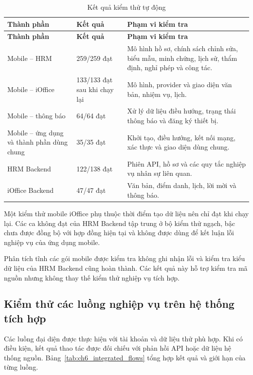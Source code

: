 \begin{xltabular}{\textwidth}{|L{2.8cm}|L{2.0cm}|Y|}
\caption{Kết quả kiểm thử tự động}\label{tab:ch6_automated_tests} \\
\hline
\textbf{Thành phần} & \textbf{Kết quả} & \textbf{Phạm vi kiểm tra} \\
\hline
\endfirsthead
\hline
\textbf{Thành phần} & \textbf{Kết quả} & \textbf{Phạm vi kiểm tra} \\
\hline
\endhead
Mobile -- HRM & 259/259 đạt & Mô hình hồ sơ, chính sách chỉnh sửa, biểu mẫu, minh chứng, lịch sử, thẩm định, nghỉ phép và công tác. \\
\hline
Mobile -- iOffice & 133/133 đạt sau khi chạy lại & Mô hình, provider và giao diện văn bản, nhiệm vụ, lịch. \\
\hline
Mobile -- thông báo & 64/64 đạt & Xử lý dữ liệu điều hướng, trạng thái thông báo và đăng ký thiết bị. \\
\hline
Mobile -- ứng dụng và thành phần dùng chung & 35/35 đạt & Khởi tạo, điều hướng, kết nối mạng, xác thực và giao diện dùng chung. \\
\hline
HRM Backend & 122/138 đạt & Phiên API, hồ sơ và các quy tắc nghiệp vụ nhân sự liên quan. \\
\hline
iOffice Backend & 47/47 đạt & Văn bản, điểm danh, lịch, lời mời và thông báo. \\
\hline
\end{xltabular}

Một kiểm thử mobile iOffice phụ thuộc thời điểm tạo dữ liệu nên chỉ đạt khi chạy lại. Các ca không đạt của HRM Backend tập trung ở bộ kiểm thử ngạch, bậc chưa được đồng bộ với hợp đồng hiện tại và không được dùng để kết luận lỗi nghiệp vụ của ứng dụng mobile.

Phân tích tĩnh các gói mobile được kiểm tra không ghi nhận lỗi và kiểm tra kiểu dữ liệu của HRM Backend cũng hoàn thành. Các kết quả này hỗ trợ kiểm tra mã nguồn nhưng không thay thế kiểm thử nghiệp vụ tích hợp.

\subsection{Kiểm thử các luồng nghiệp vụ trên hệ thống tích hợp}
\label{sec:kiemthu_tichhop}

Các luồng đại diện được thực hiện với tài khoản và dữ liệu thử phù hợp. Khi có điều kiện, kết quả thao tác được đối chiếu với phản hồi API hoặc dữ liệu hệ thống nguồn. Bảng~\ref{tab:ch6_integrated_flows} tổng hợp kết quả và giới hạn của từng luồng.

